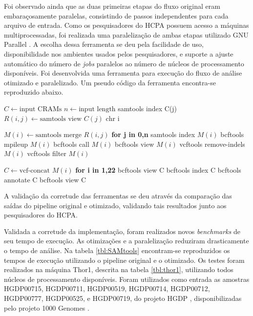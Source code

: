 \documentclass[cic,tc]{iiufrgs}
\begin{document}
Foi observado ainda que as duas primeiras etapas do fluxo original eram
embaraçosamente paralelas, consistindo de passos independentes para cada
arquivo de entrada.  Como os pesquisadores do HCPA possuem acesso a máquinas
multiprocessadas, foi realizada uma paralelização de ambas etapas utilizado GNU
Parallel \cite{tange_ole_2021_5233953}. A escolha dessa ferramenta se deu pela
facilidade de uso, disponibilidade nos ambientes usados pelos pesquisadores, e
suporte a ajuste automático do número de \textit{jobs} paralelos ao número de
núcleos de processamento disponíveis. Foi desenvolvida uma ferramenta para
execução do fluxo de análise otimizado e paralelizado. Um pseudo código da
ferramenta encontra-se reproduzido abaixo.

\begin{algorithmic}
  \State $C \gets \text{input CRAMs}$
  \State $n \gets \text{input length}$
  \State samtools index C(j)
    \State $R(i,j) \gets \text{samtools view } C(j) \text{ chr i}$
  \EndFor
\EndFor

  \State $M(i) \gets \text{samtools merge } R(i,j)$ \textbf{for j in 0,n}
  \State samtools index $M(i)$
  \State bcftools mpileup $M(i)$
  \State bcftools call $M(i)$
  \State bcftools view $M(i)$
  \State vcftools remove-indels $M(i)$
  \State vcftools filter $M(i)$
\EndFor

\State $C \gets \text{vcf-concat } M(i)$ \textbf{for i in 1,22}
\State bcftools view C
\State bcftools index C
\State bcftools annotate C
\State bcftools view C
\end{algorithmic}

A validação da corretude das ferramentas se deu através da comparação das
saídas do pipeline original e otimizado, validando tais resultados junto aos
pesquisadores do HCPA.

Validada a corretude da implementação, foram realizados novos \textit{benchmarks} de seu
tempo de execução. As otimizações e a paralelização reduziram drasticamente o
tempo de análise. Na tabela \ref{tbl:SAMtools} encontram-se reproduzidos os
tempos de execução utilizando o pipeline original e o otimizado. Os testes
foram realizados na máquina Thor1, descrita na tabela \ref{tbl:thor1},
utilizando todos núcleos de processamento disponíveis. Foram utilizados como
entrada as amostras HGDP00715, HGDP00711, HGDP00519, HGDP00714, HGDP00712,
HGDP00777, HGDP00525, e HGDP00719, do projeto HGDP \cite{cavalli2005human},
disponibilizadas pelo projeto 1000 Genomes \cite{via20101000}.
\end{document}
